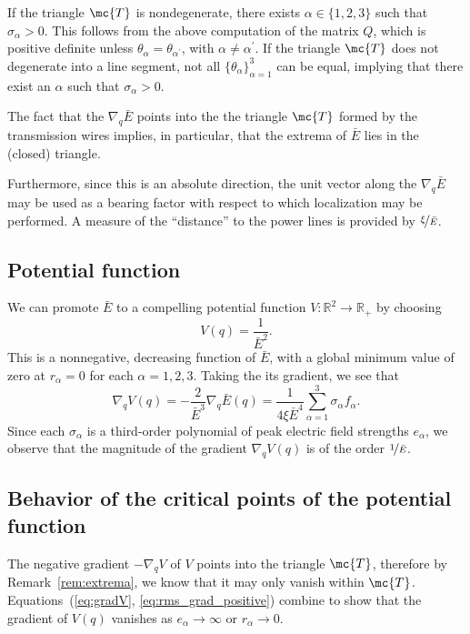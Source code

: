 \begin{rem}
If the triangle $\mc{T}$ is nondegenerate, there exists $\alpha \in \{1, 2, 3\}$
such that $\sigma_\alpha > 0$. This follows from the above computation of the
matrix $Q$, which is positive definite unless $\theta_\alpha =
\theta_{\alpha^\prime}$, with $\alpha \neq \alpha^\prime$. If the triangle
$\mc{T}$ does not degenerate into a line segment, not all
$\{\theta_\alpha\}_{\alpha=1}^3$ can be equal, implying that there exist an
$\alpha$ such that $\sigma_\alpha > 0$. 
\end{rem}

\begin{rem} \label{rem:extrema}
    The fact that the $\nabla_q\bar{E}$ points into the the triangle $\mc{T}$
    formed by the transmission wires implies, in particular, that the extrema of
    $\bar{E}$ lies in the (closed) triangle.

    Furthermore, since this is an absolute direction, the unit vector along the
    $\nabla_q \bar{E}$ may be used as a bearing factor with respect to which
    localization may be performed. A measure of the ``distance'' to the power
    lines is provided by $\nicefrac{\xi}{\bar{E}}$.
\end{rem}

\subsection{Potential function}
%
We can promote $\bar{E}$ to a compelling potential function $V: \mathbb{R}^2
\rightarrow \mathbb{R}_+$ by choosing
%
\begin{equation}
    V(q) = \dfrac{1}{\bar{E}^2}.
    \label{eq:potential}
\end{equation}
%
This is a nonnegative, decreasing function of $\bar{E}$, with a global minimum
value of zero at $r_\alpha = 0$ for each $\alpha = 1, 2, 3$. Taking the its
gradient, we see that 
%
\begin{equation}
    \nabla_q V(q) = -\dfrac{2}{\bar{E}^3}\nabla_q\bar{E} (q)
    = \frac{1}{4\xi\bar{E}^4} \sum_{\alpha=1}^3 \sigma_\alpha f_\alpha.
    \label{eq:gradV}
\end{equation}
%
Since each $\sigma_\alpha$ is a third-order polynomial of peak electric field
strengths $e_\alpha$, we observe that the magnitude of the gradient
$\nabla_qV(q)$ is of the order $\nicefrac{1}{\bar{E}}$.

\subsection{Behavior of the critical points of the potential function}
\label{ssec:behavior}
%
The negative gradient $-\nabla_qV$ of $V$ points into the triangle $\mc{T}$,
therefore by Remark~\ref{rem:extrema}, we know that it may only vanish
within $\mc{T}$. Equations~(\ref{eq:gradV}, \ref{eq:rms_grad_positive}) combine
to show that the gradient of $V(q)$ vanishes as $e_\alpha \rightarrow \infty$ or
$r_\alpha \rightarrow 0$. 

